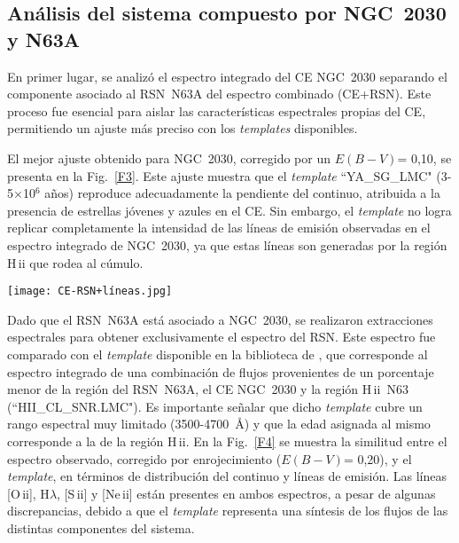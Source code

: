 \documentclass[baaa]{baaa}
\begin{document}
\subsection{Análisis del sistema compuesto por NGC~2030 y N63A}

 En primer lugar, se analizó el espectro integrado del CE NGC~2030 separando el componente asociado al RSN~N63A del espectro combinado (CE+RSN). Este proceso fue esencial para aislar las características espectrales propias del CE, permitiendo un ajuste más preciso con los \textit{templates} disponibles. 
 
 El mejor ajuste obtenido para NGC~2030, corregido por un \(E(B-V)\)= 0,10, se presenta en la Fig.~\ref{F3}. Este ajuste muestra que el \textit{template} ``YA\_SG\_LMC" (3-5$\times$10$^{6}$ años) reproduce adecuadamente la pendiente del continuo, atribuida a la presencia de estrellas jóvenes y azules en el CE. Sin embargo, el \textit{template} no logra replicar completamente la intensidad de las líneas de emisión observadas en el espectro integrado de NGC~2030, ya que estas líneas son generadas por la región H\,{\sc ii} que rodea al cúmulo.

\begin{figure*}[!ht]
\centering
\texttt{[image: CE-RSN+líneas.jpg]}  
\caption{Comparación entre el espectro integrado del CE NGC~2030, sin la contribución del RSN~N63A, y un \textit{template} correspondiente a un rango de edad (3-5 $\times$ 10$^{6}$~años), ajustado con un exceso de color $E(B-V) = 0,10\pm 0,05$ \citep{Santos+1995}. 
}
\label{F3}
\end{figure*}




 Dado que el RSN~N63A está asociado a NGC~2030, se realizaron extracciones espectrales para obtener exclusivamente el espectro del RSN. Este espectro fue comparado con el  \textit{template}  disponible en la biblioteca de \cite{Santos+1995}, que corresponde al espectro integrado de una combinación de flujos provenientes de un porcentaje menor de la región del RSN~N63A, el CE NGC~2030 y la región H\,{\sc ii}~N63 (``HII\_CL\_SNR.LMC"). 
 Es importante señalar que dicho \textit{template} cubre un rango espectral muy limitado (3500-4700~$\text{Å}$) y que la edad asignada al mismo corresponde a la de la región H\,{\sc ii}. 
 En la Fig.~\ref{F4} se muestra la similitud entre el espectro observado, corregido por enrojecimiento (\(E(B-V)\)= 0,20), y el \textit{template}, en términos de distribución del continuo y líneas de emisión. 
 Las líneas [O\,{\sc ii}], H$\lambda$, [S\,{\sc ii}] y [Ne\,{\sc ii}] están presentes en ambos espectros, a pesar de algunas discrepancias, debido a que el \textit{template} representa una síntesis de los flujos de las distintas componentes del sistema.
\end{document}
